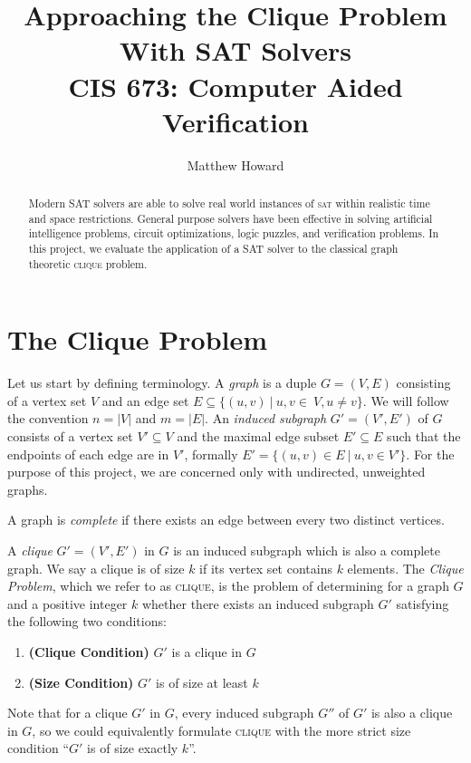 \documentclass[]{article}
\title{Approaching the Clique Problem\\ With SAT Solvers\\[.2cm]
	\large{CIS 673: Computer Aided Verification}}
\author{Matthew Howard}
\newcommand{\clique}{\textsc{clique}}
\begin{document}
	
	\maketitle
	
	\begin{abstract}
		Modern SAT solvers are able to solve real world instances of \textsc{sat} within realistic time and space restrictions. General purpose solvers have been effective in solving artificial intelligence problems, circuit optimizations, logic puzzles, and verification problems. In this project, we evaluate the application of a SAT solver to the classical graph theoretic \clique{} problem.
	\end{abstract}
	
	\section{The Clique Problem}
	
	Let us start by defining terminology. A \textit{graph} is a duple $G = (V, E)$ consisting of a vertex set $V$ and an edge set $E \subseteq \{(u, v) ~\vert~ u, v \in~V, u \neq v\}$. We will follow the convention $n = |V|$ and $m = |E|$. An \textit{induced subgraph} $G' = (V', E')$ of $G$ consists of a vertex set $V' \subseteq V$ and the maximal edge subset $E' \subseteq E$ such that the endpoints of each edge are in $V'$, formally $E' = \{(u, v) \in E ~\vert~ u, v \in V'\}$. For the purpose of this project, we are concerned only with undirected, unweighted graphs.
	
	A graph is \textit{complete} if there exists an edge between every two distinct vertices.
	
	A \textit{clique} $G' = (V', E')$ in $G$ is an induced subgraph which is also a complete graph. We say a clique is of size $k$ if its vertex set contains $k$ elements. The \textit{Clique Problem}, which we refer to as \clique{}, is the problem of determining for a graph $G$ and a positive integer $k$ whether there exists an induced subgraph $G'$ satisfying the following two conditions:
	\begin{enumerate}
		\item \textbf{(Clique Condition)} $G'$ is a clique in $G$
		\item \textbf{(Size Condition)} $G'$ is of size at least $k$
	\end{enumerate}	
	
	Note that for a clique $G'$ in $G$, every induced subgraph $G''$ of $G'$ is also a clique in $G$, so we could equivalently formulate \clique{} with the more strict size condition ``$G'$ is of size exactly $k$''.
	
\end{document}
